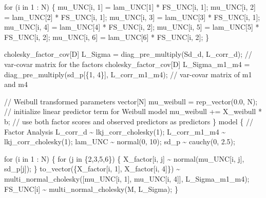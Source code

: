 \documentclass[
  letterpaper,
  DIV=11,
  numbers=noendperiod]{scrreprt}
\newenvironment{Shaded}{\begin{snugshade}}{\end{snugshade}}
\newcommand{\CommentTok}[1]{\textcolor[rgb]{0.37,0.37,0.37}{#1}}
\newcommand{\ControlFlowTok}[1]{\textcolor[rgb]{0.00,0.23,0.31}{#1}}
\newcommand{\DataTypeTok}[1]{\textcolor[rgb]{0.68,0.00,0.00}{#1}}
\newcommand{\DecValTok}[1]{\textcolor[rgb]{0.68,0.00,0.00}{#1}}
\newcommand{\FloatTok}[1]{\textcolor[rgb]{0.68,0.00,0.00}{#1}}
\newcommand{\KeywordTok}[1]{\textcolor[rgb]{0.00,0.23,0.31}{#1}}
\newcommand{\NormalTok}[1]{\textcolor[rgb]{0.00,0.23,0.31}{#1}}
\begin{document}
\begin{Shaded}
\begin{Highlighting}[]
  \ControlFlowTok{for}\NormalTok{ (i }\ControlFlowTok{in} \DecValTok{1}\NormalTok{ : N) \{}
\NormalTok{    mu\_UNC[i, }\DecValTok{1}\NormalTok{] = lam\_UNC[}\DecValTok{1}\NormalTok{] * FS\_UNC[i, }\DecValTok{1}\NormalTok{];}
\NormalTok{    mu\_UNC[i, }\DecValTok{2}\NormalTok{] = lam\_UNC[}\DecValTok{2}\NormalTok{] * FS\_UNC[i, }\DecValTok{1}\NormalTok{];}
\NormalTok{    mu\_UNC[i, }\DecValTok{3}\NormalTok{] = lam\_UNC[}\DecValTok{3}\NormalTok{] * FS\_UNC[i, }\DecValTok{1}\NormalTok{];}
\NormalTok{    mu\_UNC[i, }\DecValTok{4}\NormalTok{] = lam\_UNC[}\DecValTok{4}\NormalTok{] * FS\_UNC[i, }\DecValTok{2}\NormalTok{];}
\NormalTok{    mu\_UNC[i, }\DecValTok{5}\NormalTok{] = lam\_UNC[}\DecValTok{5}\NormalTok{] * FS\_UNC[i, }\DecValTok{2}\NormalTok{];}
\NormalTok{    mu\_UNC[i, }\DecValTok{6}\NormalTok{] = lam\_UNC[}\DecValTok{6}\NormalTok{] * FS\_UNC[i, }\DecValTok{2}\NormalTok{];}
\NormalTok{  \}}
  
  \DataTypeTok{cholesky\_factor\_cov}\NormalTok{[D] L\_Sigma = diag\_pre\_multiply(Sd\_d, L\_corr\_d); }\CommentTok{// var{-}covar matrix for the factors}
  \DataTypeTok{cholesky\_factor\_cov}\NormalTok{[D] L\_Sigma\_m1\_m4 = diag\_pre\_multiply(sd\_p[\{}\DecValTok{1}\NormalTok{, }\DecValTok{4}\NormalTok{\}], L\_corr\_m1\_m4); }\CommentTok{// var{-}covar matrix of m1 and m4}
  
  \CommentTok{// Weibull transformed parameters}
  \DataTypeTok{vector}\NormalTok{[N] mu\_weibull = rep\_vector(}\FloatTok{0.0}\NormalTok{, N); }\CommentTok{// initialize linear predictor term for Weibull model}
\NormalTok{  mu\_weibull += X\_weibull * b; }\CommentTok{// use both factor scores and observed predictors as predictors}
\NormalTok{\}}
\KeywordTok{model}\NormalTok{ \{}
  \CommentTok{// Factor Analysis}
\NormalTok{  L\_corr\_d \textasciitilde{} lkj\_corr\_cholesky(}\DecValTok{1}\NormalTok{);}
\NormalTok{  L\_corr\_m1\_m4 \textasciitilde{} lkj\_corr\_cholesky(}\DecValTok{1}\NormalTok{);}
\NormalTok{  lam\_UNC \textasciitilde{} normal(}\DecValTok{0}\NormalTok{, }\DecValTok{10}\NormalTok{);}
\NormalTok{  sd\_p \textasciitilde{} cauchy(}\DecValTok{0}\NormalTok{, }\FloatTok{2.5}\NormalTok{);}
  
  \ControlFlowTok{for}\NormalTok{ (i }\ControlFlowTok{in} \DecValTok{1}\NormalTok{ : N) \{}
    \ControlFlowTok{for}\NormalTok{ (j }\ControlFlowTok{in}\NormalTok{ \{}\DecValTok{2}\NormalTok{,}\DecValTok{3}\NormalTok{,}\DecValTok{5}\NormalTok{,}\DecValTok{6}\NormalTok{\}) \{}
\NormalTok{      X\_factor[i, j] \textasciitilde{} normal(mu\_UNC[i, j], sd\_p[j]);}
\NormalTok{    \}}
\NormalTok{    to\_vector(\{X\_factor[i, }\DecValTok{1}\NormalTok{], X\_factor[i, }\DecValTok{4}\NormalTok{]\}) \textasciitilde{} multi\_normal\_cholesky([mu\_UNC[i, }\DecValTok{1}\NormalTok{], mu\_UNC[i, }\DecValTok{4}\NormalTok{]]\textquotesingle{}, L\_Sigma\_m1\_m4);}
\NormalTok{    FS\_UNC[i] \textasciitilde{} multi\_normal\_cholesky(M, L\_Sigma);}
\NormalTok{  \}}


\end{Highlighting}
\end{Shaded}
\end{document}
